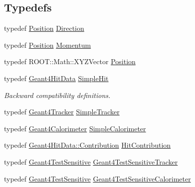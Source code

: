 \subsection*{Typedefs}
\begin{DoxyCompactItemize}
\item 
typedef \hyperlink{namespace_d_d4hep_1_1_geometry_a55083902099d03506c6db01b80404900}{Position} \hyperlink{namespace_d_d4hep_1_1_simulation_a4b5bfd838293f3222b9d004c7dd1d6b3}{Direction}
\item 
typedef \hyperlink{namespace_d_d4hep_1_1_geometry_a55083902099d03506c6db01b80404900}{Position} \hyperlink{namespace_d_d4hep_1_1_simulation_aead01eb580dc503a5abba194d179c963}{Momentum}
\item 
typedef R\+O\+O\+T\+::\+Math\+::\+X\+Y\+Z\+Vector \hyperlink{namespace_d_d4hep_1_1_simulation_ad6fd94b3439e31d1ba4b2e640d578558}{Position}
\item 
typedef \hyperlink{class_d_d4hep_1_1_simulation_1_1_geant4_hit_data}{Geant4\+Hit\+Data} \hyperlink{namespace_d_d4hep_1_1_simulation_a0a561b07f32c81b4365bdc61e74e645b}{Simple\+Hit}
\begin{DoxyCompactList}\small\item\em Backward compatibility definitions. \end{DoxyCompactList}\item 
typedef \hyperlink{class_d_d4hep_1_1_simulation_1_1_geant4_tracker}{Geant4\+Tracker} \hyperlink{namespace_d_d4hep_1_1_simulation_aeac70046c56d692918ebee2e3cdd8c3f}{Simple\+Tracker}
\item 
typedef \hyperlink{class_d_d4hep_1_1_simulation_1_1_geant4_calorimeter}{Geant4\+Calorimeter} \hyperlink{namespace_d_d4hep_1_1_simulation_a05940f87d83b165713f6c92d7cd9425f}{Simple\+Calorimeter}
\item 
typedef \hyperlink{class_d_d4hep_1_1_simulation_1_1_geant4_hit_data_aec2f53237eac2db7d83dd03bca8719c5}{Geant4\+Hit\+Data\+::\+Contribution} \hyperlink{namespace_d_d4hep_1_1_simulation_af3e4b03fc6b6e8a0ed0cba9dbf6c1f69}{Hit\+Contribution}
\item 
typedef \hyperlink{class_d_d4hep_1_1_simulation_1_1_test_1_1_geant4_test_sensitive}{Geant4\+Test\+Sensitive} \hyperlink{namespace_d_d4hep_1_1_simulation_a6a20cbc2140f1f0da9332fe90fb80600}{Geant4\+Test\+Sensitive\+Tracker}
\item 
typedef \hyperlink{class_d_d4hep_1_1_simulation_1_1_test_1_1_geant4_test_sensitive}{Geant4\+Test\+Sensitive} \hyperlink{namespace_d_d4hep_1_1_simulation_a67912331acd262c46253c23cbc346cf5}{Geant4\+Test\+Sensitive\+Calorimeter}

\end{DoxyCompactItemize}
